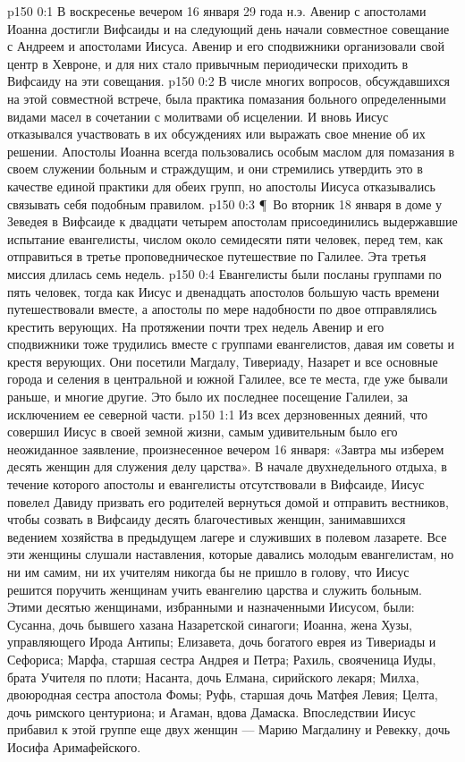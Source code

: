 \author{Комиссия срединников}
\vs p150 0:1 В воскресенье вечером 16 января 29 года н.э. Авенир с апостолами Иоанна достигли Вифсаиды и на следующий день начали совместное совещание с Андреем и апостолами Иисуса. Авенир и его сподвижники организовали свой центр в Хевроне, и для них стало привычным периодически приходить в Вифсаиду на эти совещания.
\vs p150 0:2 В числе многих вопросов, обсуждавшихся на этой совместной встрече, была практика помазания больного определенными видами масел в сочетании с молитвами об исцелении. И вновь Иисус отказывался участвовать в их обсуждениях или выражать свое мнение об их решении. Апостолы Иоанна всегда пользовались особым маслом для помазания в своем служении больным и страждущим, и они стремились утвердить это в качестве единой практики для обеих групп, но апостолы Иисуса отказывались связывать себя подобным правилом.
\vs p150 0:3 \P\ Во вторник 18 января в доме у Зеведея в Вифсаиде к двадцати четырем апостолам присоединились выдержавшие испытание евангелисты, числом около семидесяти пяти человек, перед тем, как отправиться в третье проповедническое путешествие по Галилее. Эта третья миссия длилась семь недель.
\vs p150 0:4 Евангелисты были посланы группами по пять человек, тогда как Иисус и двенадцать апостолов большую часть времени путешествовали вместе, а апостолы по мере надобности по двое отправлялись крестить верующих. На протяжении почти трех недель Авенир и его сподвижники тоже трудились вместе с группами евангелистов, давая им советы и крестя верующих. Они посетили Магдалу, Тивериаду, Назарет и все основные города и селения в центральной и южной Галилее, все те места, где уже бывали раньше, и многие другие. Это было их последнее посещение Галилеи, за исключением ее северной части.
\vs p150 1:1 Из всех дерзновенных деяний, что совершил Иисус в своей земной жизни, самым удивительным было его неожиданное заявление, произнесенное вечером 16 января: «Завтра мы изберем десять женщин для служения делу царства». В начале двухнедельного отдыха, в течение которого апостолы и евангелисты отсутствовали в Вифсаиде, Иисус повелел Давиду призвать его родителей вернуться домой и отправить вестников, чтобы созвать в Вифсаиду десять благочестивых женщин, занимавшихся ведением хозяйства в предыдущем лагере и служивших в полевом лазарете. Все эти женщины слушали наставления, которые давались молодым евангелистам, но ни им самим, ни их учителям никогда бы не пришло в голову, что Иисус решится поручить женщинам учить евангелию царства и служить больным. Этими десятью женщинами, избранными и назначенными Иисусом, были: Сусанна, дочь бывшего хазана Назаретской синагоги; Иоанна, жена Хузы, управляющего Ирода Антипы; Елизавета, дочь богатого еврея из Тивериады и Сефориса; Марфа, старшая сестра Андрея и Петра; Рахиль, свояченица Иуды, брата Учителя по плоти; Насанта, дочь Елмана, сирийского лекаря; Милха, двоюродная сестра апостола Фомы; Руфь, старшая дочь Матфея Левия; Целта, дочь римского центуриона; и Агаман, вдова Дамаска. Впоследствии Иисус прибавил к этой группе еще двух женщин --- Марию Магдалину и Ревекку, дочь Иосифа Аримафейского.
